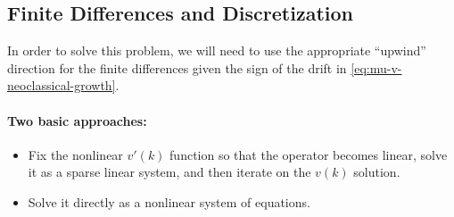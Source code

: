 \documentclass[11pt]{etk-article}
\begin{document}
\subsection{Finite Differences and Discretization}
In order to solve this problem, we will need to use the appropriate ``upwind'' direction for the finite differences given the sign of the drift in \cref{eq:mu-v-neoclassical-growth}.  
\paragraph {Two basic approaches:} 
\begin{itemize}
	\item Fix the nonlinear $v'(k)$ function so that the operator becomes linear, solve it as a sparse linear system, and then iterate on the $v(k)$ solution.
	\item Solve it directly as a nonlinear system of equations.
\end{itemize}
\end{document}
